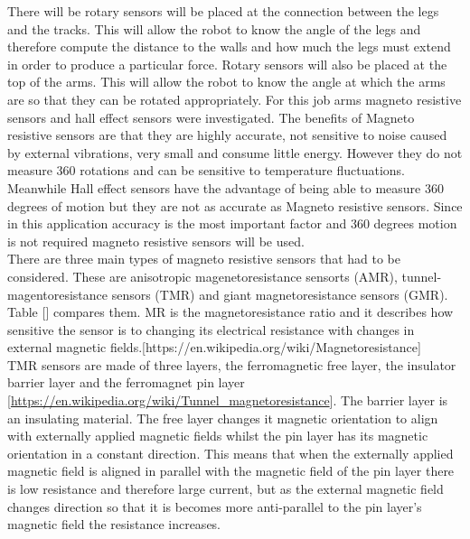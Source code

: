 \documentclass[11pt]{article}		%
\begin{document}
            There will be rotary sensors will be placed at the connection between the legs and the tracks. 
            This will allow the robot to know the angle of the legs and therefore compute the distance to the walls and how much the legs must extend in order to produce a particular force. 
            Rotary sensors will also be placed at the top of the arms. 
            This will allow the robot to know the angle at which the arms are so that they can be rotated appropriately. 
            For this job arms magneto resistive sensors and hall effect sensors were investigated. 
            The benefits of Magneto resistive sensors are that they are highly accurate, not sensitive to noise caused by external vibrations, very small and consume little energy. 
            However they do not measure 360 rotations and can be sensitive to temperature fluctuations. 
            Meanwhile Hall effect sensors have the advantage of being able to measure 360 degrees of motion but they are not as accurate as Magneto resistive sensors. 
            Since in this application accuracy is the most important factor and 360 degrees motion is not required magneto resistive sensors will be used.
            \\
            There are three main types of magneto resistive sensors that had to be considered.
            These are anisotropic magenetoresistance sensorts (AMR), tunnel-magentoresistance sensors (TMR) and giant magnetoresistance sensors (GMR). 
            Table [] compares them. 
            MR is the magnetoresistance ratio and it describes how sensitive the sensor is to changing its electrical resistance with changes in external magnetic fields.[https://en.wikipedia.org/wiki/Magnetoresistance]
            \\
            TMR sensors are made of three layers, the ferromagnetic free layer, the insulator barrier layer and the ferromagnet pin layer [\url{https://en.wikipedia.org/wiki/Tunnel_magnetoresistance}].
            The barrier layer is an insulating material.
            The free layer changes it magnetic orientation to align with externally applied magnetic fields whilst the pin layer has its magnetic orientation in a constant direction.
            This means that when the externally applied magnetic field is aligned in parallel with the magnetic field of the pin layer there is low resistance and therefore large current, but as the external magnetic field changes direction so that it is becomes more anti-parallel to the pin layer’s magnetic field the resistance increases. 
\end{document}
